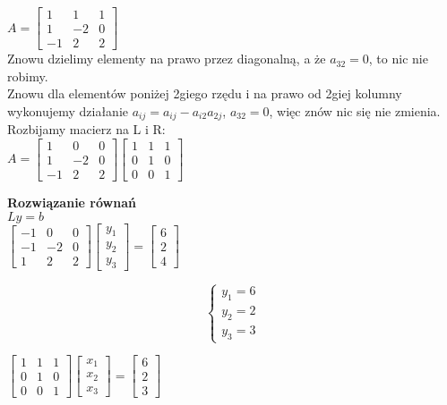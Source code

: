 \documentclass{article}
\begin{document}
$A=\begin{bmatrix} 1 & 1 & 1 \\ 1 & -2 & 0 \\ -1 & 2 & 2 \end{bmatrix}$\\

Znowu dzielimy elementy na prawo przez diagonalną, a że $a_{32}=0$, to nic nie robimy.\\
Znowu dla elementów poniżej 2giego rzędu i na prawo od 2giej kolumny wykonujemy działanie $a_{ij}=a_{ij}-a_{i2}a_{2j}$, $a_{32}=0$, więc znów nic się nie zmienia.\\
Rozbijamy macierz na L i R:\\

$A=\begin{bmatrix} 1 & 0 & 0 \\ 1 & -2 & 0 \\ -1 & 2 & 2 \end{bmatrix}\begin{bmatrix} 1 & 1 & 1 \\ 0 & 1 & 0 \\ 0 & 0 & 1 \end{bmatrix}$

\textbf{Rozwiązanie równań}\\
$Ly=b$\\
$\begin{bmatrix} -1 & 0 & 0 \\ -1 & -2 & 0 \\ 1 & 2 & 2 \end{bmatrix}\begin{bmatrix} y_1 \\ y_2 \\ y_3 \end{bmatrix} = \begin{bmatrix} 6 \\ 2 \\ 4 \end{bmatrix}$

\begin{equation*}\begin{cases}
    y_1=6\\
    y_2=2\\
    y_3=3
\end{cases}\end{equation*}

$\begin{bmatrix} 1 & 1 & 1 \\ 0 & 1 & 0 \\ 0 & 0 & 1 \end{bmatrix}\begin{bmatrix} x_1 \\ x_2 \\ x_3 \end{bmatrix} = \begin{bmatrix} 6 \\ 2 \\ 3 \end{bmatrix}$
\end{document}

